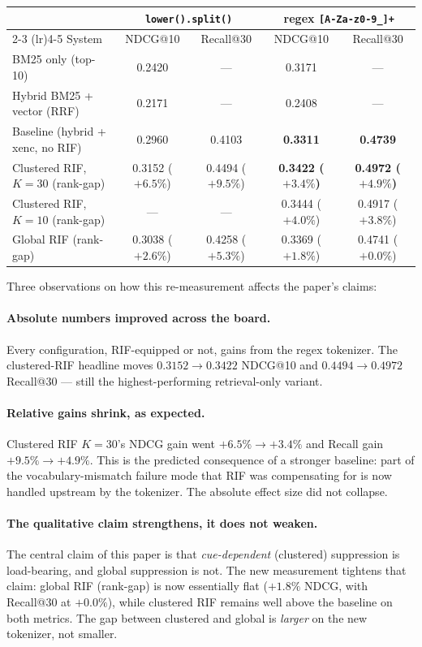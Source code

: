\documentclass[11pt,a4paper]{article}
\begin{document}
\begin{table}[h]
\centering
\small
\begin{tabular}{lcccc}
\toprule
& \multicolumn{2}{c}{\texttt{lower().split()}} & \multicolumn{2}{c}{regex \texttt{[A-Za-z0-9\_]+}} \\
\cmidrule(lr){2-3} \cmidrule(lr){4-5}
System & NDCG@10 & Recall@30 & NDCG@10 & Recall@30 \\
\midrule
BM25 only (top-10) & 0.2420 & --- & 0.3171 & --- \\
Hybrid BM25 + vector (RRF) & 0.2171 & --- & 0.2408 & --- \\
Baseline (hybrid + xenc, no RIF) & 0.2960 & 0.4103 & \textbf{0.3311} & \textbf{0.4739} \\
Clustered RIF, $K=30$ (rank-gap) & 0.3152 ($+6.5\%$) & 0.4494 ($+9.5\%$) & \textbf{0.3422 ($+3.4\%$)} & \textbf{0.4972 ($+4.9\%$)} \\
Clustered RIF, $K=10$ (rank-gap) & --- & --- & 0.3444 ($+4.0\%$) & 0.4917 ($+3.8\%$) \\
Global RIF (rank-gap) & 0.3038 ($+2.6\%$) & 0.4258 ($+5.3\%$) & 0.3369 ($+1.8\%$) & 0.4741 ($+0.0\%$) \\
\bottomrule
\end{tabular}
\end{table}

Three observations on how this re-measurement affects the paper's claims:

\paragraph{Absolute numbers improved across the board.} Every configuration, RIF-equipped or not, gains from the regex tokenizer. The clustered-RIF headline moves $0.3152 \to 0.3422$ NDCG@10 and $0.4494 \to 0.4972$ Recall@30 — still the highest-performing retrieval-only variant.

\paragraph{Relative gains shrink, as expected.} Clustered RIF $K=30$'s NDCG gain went $+6.5\% \to +3.4\%$ and Recall gain $+9.5\% \to +4.9\%$. This is the predicted consequence of a stronger baseline: part of the vocabulary-mismatch failure mode that RIF was compensating for is now handled upstream by the tokenizer. The absolute effect size did not collapse.

\paragraph{The qualitative claim strengthens, it does not weaken.} The central claim of this paper is that \emph{cue-dependent} (clustered) suppression is load-bearing, and global suppression is not. The new measurement tightens that claim: global RIF (rank-gap) is now essentially flat ($+1.8\%$ NDCG, with Recall@30 at $+0.0\%$), while clustered RIF remains well above the baseline on both metrics. The gap between clustered and global is \emph{larger} on the new tokenizer, not smaller.
\end{document}
